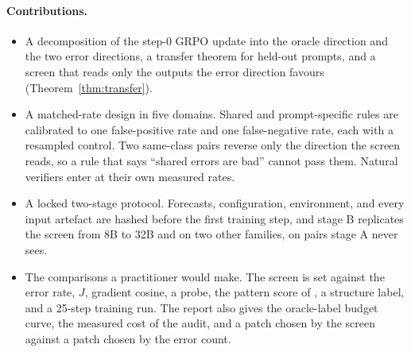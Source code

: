 \paragraph{Contributions.}
\begin{itemize}
\item A decomposition of the step-0 GRPO update into the oracle direction and the two error directions, a transfer theorem for held-out prompts, and a screen that reads only the outputs the error direction favours (Theorem~\ref{thm:transfer}).
\item A matched-rate design in five domains. Shared and prompt-specific rules are calibrated to one false-positive rate and one false-negative rate, each with a resampled control. Two same-class pairs reverse only the direction the screen reads, so a rule that says ``shared errors are bad'' cannot pass them. Natural verifiers enter at their own measured rates.
\item A locked two-stage protocol. Forecasts, configuration, environment, and every input artefact are hashed before the first training step, and stage B replicates the screen from 8B to 32B and on two other families, on pairs stage A never sees.
\item The comparisons a practitioner would make. The screen is set against the error rate, $J$, gradient cosine, a probe, the pattern score of \citet{egashira2026delay}, a structure label, and a 25-step training run. The report also gives the oracle-label budget curve, the measured cost of the audit, and a patch chosen by the screen against a patch chosen by the error count.
\end{itemize}
